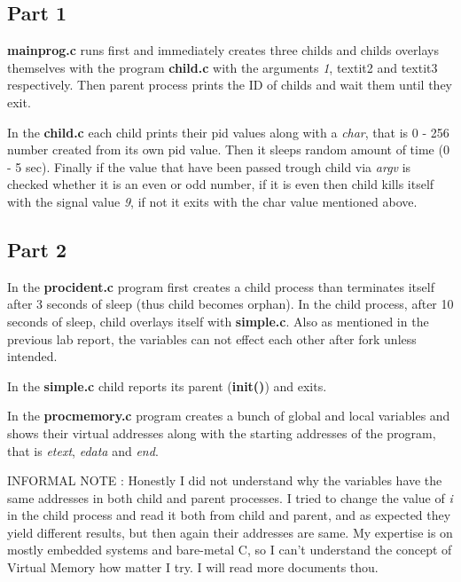\documentclass[11pt]{article}
\begin{document}
\subsection*{Part 1}

\textbf{mainprog.c} runs first and immediately creates three childs and childs overlays themselves with the program \textbf{child.c} with the arguments \textit{1}, textit{2} and textit{3} respectively. Then parent process prints the ID of childs and wait them until they exit.

In the \textbf{child.c} each child prints their pid values along with a \textit{char}, that is 0 - 256 number created from its own pid value. Then it sleeps random amount of time (0 - 5 sec). Finally if the value that have been passed trough child via \textit{argv} is checked whether it is an even or odd number, if it is even then child kills itself with the signal value \textit{9}, if not it exits with the char value mentioned above.

\subsection*{Part 2}

In the \textbf{procident.c} program first creates a child process than terminates itself after 3 seconds of sleep (thus child becomes orphan). In the child process, after 10 seconds of sleep, child overlays itself with \textbf{simple.c}.  Also as mentioned in the previous lab report, the variables can not effect each other after fork unless intended. 

In the \textbf{simple.c} child reports its parent (\textbf{init()}) and exits.

In the \textbf{procmemory.c} program creates a bunch of global and local variables and shows their virtual addresses along with the starting addresses of the program, that is \textit{etext}, \textit{edata} and \textit{end}. 

INFORMAL NOTE : Honestly I did not understand why the variables have the same addresses in both child and parent processes. I tried to change the value of \textit{i} in the child process and read it both from child and parent, and as expected they yield different results, but then again their addresses are same. My expertise is on mostly embedded systems and bare-metal C, so I can't understand the concept of Virtual Memory how matter I try. I will read more documents thou.
\end{document}

